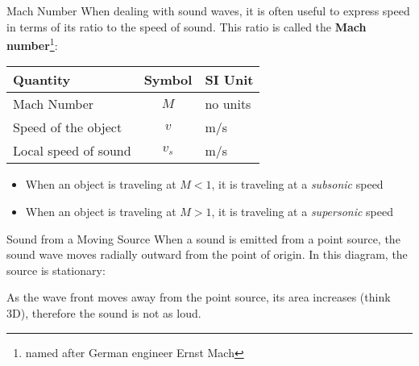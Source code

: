 \documentclass[12pt,aspectratio=169]{beamer}
\newcommand{\eq}[2]{\vspace{#1}{\Large\begin{displaymath}#2\end{displaymath}}}
\begin{document}
\begin{frame}{Mach Number}
  When dealing with sound waves, it is often useful to express speed in terms
  of its ratio to the speed of sound. This ratio is called the
  \textbf{Mach number}\footnote{named after German engineer Ernst Mach}:
  
  \eq{-.2in}{
    \boxed{M=\frac{v}{v_s}}
  }
  \begin{center}
    \begin{tabular}{l|c|l}
      \rowcolor{pink}
      \textbf{Quantity} & \textbf{Symbol} & \textbf{SI Unit} \\ \hline
      Mach Number         & $M$   & no units \\
      Speed of the object & $v$   & \si{m/s} \\
      Local speed of sound & $v_s$ & \si{m/s}
    \end{tabular}
  \end{center}
  \begin{itemize}
  \item When an object is traveling at $M<1$, it is traveling at a
    \emph{subsonic} speed
  \item When an object is traveling at $M>1$, it is traveling at a
    \emph{supersonic} speed
  \end{itemize}
\end{frame}



\begin{frame}{Sound from a Moving Source}
  When a sound is emitted from a point source, the sound wave moves radially
  outward from the point of origin. In this diagram, the source is stationary:
  \begin{center}
  \end{center}
  As the wave front moves away from the point source, its area increases (think
  3D), therefore the sound is not as loud.
\end{frame}
\end{document}
